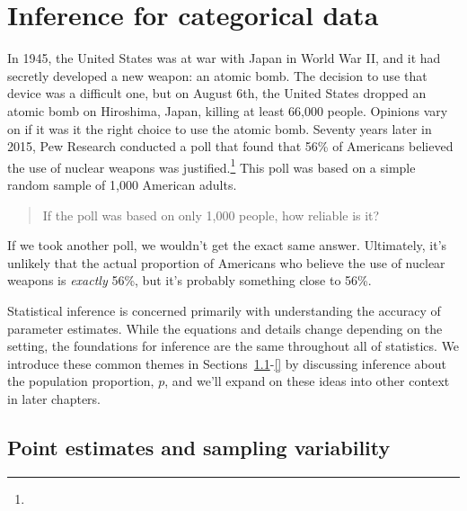 
\chapter{Inference for categorical data}
\label{inferenceForCategoricalData}



In 1945, the United States was at war with Japan in World War II, and
it had secretly developed a new weapon: an atomic bomb. The decision
to use that device was a difficult one, but on August 6th, the United
States dropped an atomic bomb on Hiroshima, Japan, killing at least
66,000 people. Opinions vary on if it was it the right choice to use
the atomic bomb. Seventy years later in 2015, Pew Research conducted
a poll that found that 56\% of Americans believed the use of nuclear
weapons was justified.\footnote{
}
This poll was based on a simple random sample of 1,000 American
adults.
\begin{quote}
If the poll was based on only 1,000 people, how reliable is it?
\end{quote}
If we took another poll, we wouldn't get the exact same answer.
Ultimately, it's unlikely that the actual proportion of Americans
who believe the use of nuclear weapons is \emph{exactly} 56\%,
but it's probably something close to 56\%.

Statistical inference is concerned primarily with understanding the
accuracy of parameter estimates. While the equations and details change
depending on the setting, the foundations for inference are the same
throughout all of statistics. We introduce these common themes in
Sections~\ref{pointEstimates}-\ref{} by discussing inference about the
population proportion, $p$, and we'll expand on these ideas into other
context in later chapters.


\section[Point estimates and sampling variability]{Point estimates and
sampling variability} %
\label{pointEstimates}

